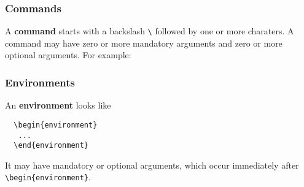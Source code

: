 \documentclass[a4paper,11pt]{scrartcl}\usepackage[]{graphicx}\usepackage[]{color}
\newcommand{\defi}[1]{\textbf{\textsf{#1}}}
\begin{document}
 \subsubsection{Commands}
 A \defi{command} starts with a backslash \verb=\= followed by one or more charaters. A {command} may have zero or more mandatory arguments and zero or more optional arguments. For example:
 \begin{table}[H]
 \raggedright
 \renewcommand{\arraystretch}{1.4}
 \newlength{\tabularxlength}
 \setlength{\tabularxlength}{\linewidth}
 \addtolength{\tabularxlength}{0.5\paperwidth}
 \addtolength{\tabularxlength}{-0.5\linewidth}
 \caption{Examples of commands and their arguments}
 \end{table}
 \clearpage
 \subsubsection{Environments}
 An \defi{environment} looks like
\begin{lstlisting}
  \begin{environment}
   ...
  \end{environment}
\end{lstlisting}
It may have mandatory or optional arguments, which occur immediately after \verb=\begin{environment}=.  
\end{document}
